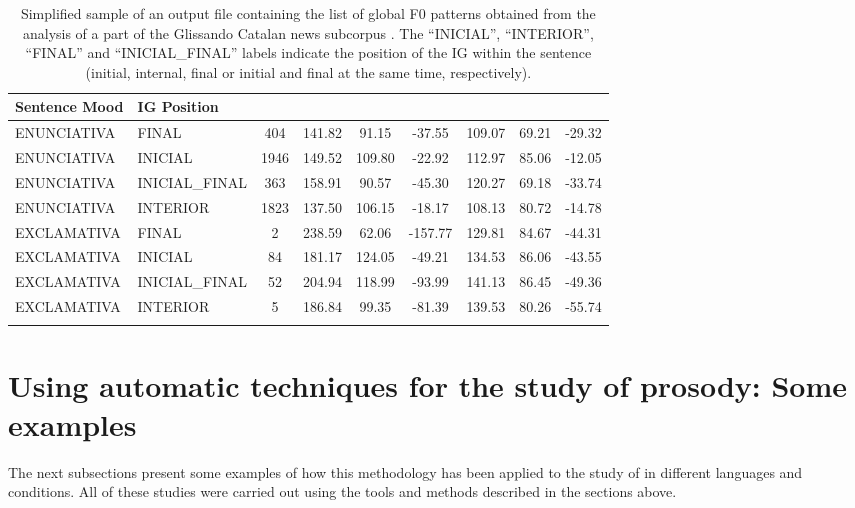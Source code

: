 \documentclass[output=paper]{langsci/langscibook}
\begin{document}
\begin{table}
\begin{tabularx}{\textwidth}{ll *{7}{S}}
\lsptoprule
Sentence Mood & IG Position &  &  &  &  &  &  &  \\
\midrule
ENUNCIATIVA & FINAL & 404 & 141.82 & 91.15 & -37.55 & 109.07 & 69.21 & -29.32\\
ENUNCIATIVA & INICIAL & 1946 & 149.52 & 109.80 & -22.92 & 112.97 & 85.06 & -12.05\\
ENUNCIATIVA & INICIAL\_FINAL & 363 & 158.91 & 90.57 & -45.30 & 120.27 & 69.18 & -33.74\\
ENUNCIATIVA & INTERIOR & 1823 & 137.50 & 106.15 & -18.17 & 108.13 & 80.72 & -14.78\\
EXCLAMATIVA & FINAL & 2 & 238.59 & 62.06 & -157.77 & 129.81 & 84.67 & -44.31\\
EXCLAMATIVA & INICIAL & 84 & 181.17 & 124.05 & -49.21 & 134.53 & 86.06 & -43.55\\
EXCLAMATIVA & INICIAL\_FINAL & 52 & 204.94 & 118.99 & -93.99 & 141.13 & 86.45 & -49.36\\
EXCLAMATIVA & INTERIOR & 5 & 186.84 & 99.35 & -81.39 & 139.53 & 80.26 & -55.74\\

\lspbottomrule
\end{tabularx}
\caption{Simplified sample of an output file containing the list of global F0 patterns obtained from the analysis of a part of the Glissando Catalan news subcorpus \citep{Garrido2013Glissando}. The ``INICIAL'', ``INTERIOR'', ``FINAL'' and ``INICIAL\_FINAL'' labels indicate the position of the IG within the sentence (initial, internal, final or initial and final at the same time, respectively).}
\label{tab:gar:6}
\end{table}

\clearpage
\section{Using automatic techniques for the study of prosody: Some examples}

The next subsections present some examples of how this methodology has been applied to the study of  in different languages and conditions. All of these studies were carried out using the tools and methods described in the sections above.
\end{document}
